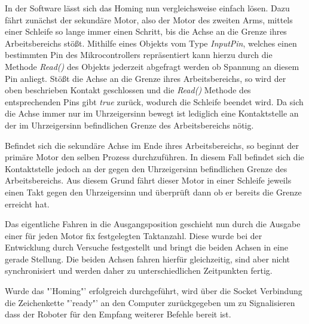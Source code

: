 In der Software lässt sich das Homing nun vergleichsweise einfach lösen. Dazu fährt zunächst der sekundäre Motor, also der Motor des zweiten Arms, mittels einer Schleife so lange immer einen Schritt, bis die Achse an die Grenze ihres Arbeitsbereichs stößt. Mithilfe eines Objekts vom Type \textit{InputPin}, welches einen bestimmten Pin des Mikrocontrollers repräsentiert kann hierzu durch die Methode \textit{Read()} des Objekts jederzeit abgefragt werden ob Spannung an diesem Pin anliegt. Stößt die Achse an die Grenze ihres Arbeitsbereichs, so wird der oben beschrieben Kontakt geschlossen und die \textit{Read()} Methode des entsprechenden Pins gibt \textit{true} zurück, wodurch die Schleife beendet wird. Da sich die Achse immer nur im Uhrzeigersinn bewegt ist lediglich eine Kontaktstelle an der im Uhrzeigersinn befindlichen Grenze des Arbeitsbereichs nötig. 

Befindet sich die sekundäre Achse im Ende ihres Arbeitsbereichs, so beginnt der primäre Motor den selben Prozess durchzuführen. In diesem Fall befindet sich die Kontaktstelle jedoch an der gegen den Uhrzeigersinn befindlichen Grenze des Arbeitsbereichs. Aus diesem Grund fährt dieser Motor in einer Schleife jeweils einen Takt gegen den Uhrzeigersinn und überprüft dann ob er bereits die Grenze erreicht hat.

Das eigentliche Fahren in die Ausgangsposition geschieht nun durch die Ausgabe einer für jeden Motor fix festgelegten Taktanzahl. Diese wurde bei der Entwicklung durch Versuche festgestellt und bringt die beiden Achsen in eine gerade Stellung. Die beiden Achsen fahren hierfür gleichzeitig, sind aber nicht synchronisiert und werden daher zu unterschiedlichen Zeitpunkten fertig. 

Wurde das "'Homing"' erfolgreich durchgeführt, wird über die Socket Verbindung die Zeichenkette "'ready"' an den Computer zurückgegeben um zu Signalisieren dass der Roboter für den Empfang weiterer Befehle bereit ist.
